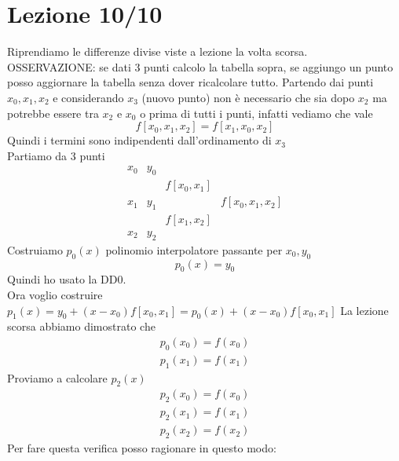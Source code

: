 \documentclass[a4paper, portrait]{book}
\numberwithin{equation}{chapter} %
\begin{document}
\chapter{Lezione 10/10}
Riprendiamo le differenze divise viste a lezione la volta scorsa.\\
OSSERVAZIONE: se dati 3 punti calcolo la tabella sopra, se aggiungo un punto posso aggiornare la tabella senza dover ricalcolare tutto. Partendo dai punti $x_0,x_1,x_2$ e considerando $x_3$ (nuovo punto) non è necessario che sia dopo $x_2$ ma potrebbe essere tra $x_2$ e $x_0$ o prima di tutti i punti, infatti vediamo che vale
\begin{equation}
    f[x_0,x_1,x_2] = f[x_1,x_0,x_2]
\end{equation}
Quindi i termini sono indipendenti dall'ordinamento di $x_3$\\
Partiamo da 3 punti
\begin{equation}
    \begin{matrix}
        x_0&y_0&&\\
        &&f[x_0,x_1]\\
        x_1&y_1&&f[x_0,x_1,x_2]\\
        &&f[x_1,x_2]\\
        x_2&y_2&&
    \end{matrix}
\end{equation}
Costruiamo $p_0(x)$ polinomio interpolatore passante per $x_0,y_0$
\begin{equation}
    p_0(x) = y_0
\end{equation}
Quindi ho usato la DD0.\\
Ora voglio costruire $p_1(x) = y_0 + (x-x_0)f[x_0,x_1] = p_0(x) + (x-x_0)f[x_0,x_1]$
La lezione scorsa abbiamo dimostrato che
\begin{gather}
    p_0(x_0) = f(x_0)\\
    p_1(x_1) = f(x_1) 
\end{gather}
Proviamo a calcolare $p_2(x)$
\begin{gather}
    p_2(x_0) = f(x_0)\\
    p_2(x_1) = f(x_1)\\
    p_2(x_2) = f(x_2)
\end{gather}
Per fare questa verifica posso ragionare in questo modo:
\end{document}
